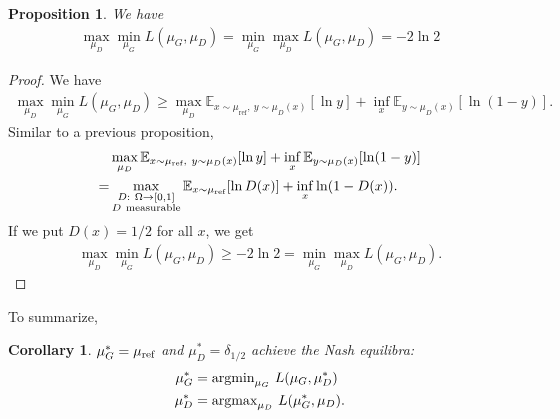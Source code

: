 \documentclass[12pt,oneside]{article}
\newcommand{\ra}[0]{\rightarrow}
\newcommand{\BE}[0]{\mathbb{E}}
\newcommand{\tn}[1]{\text{\normalfont #1}}
\newcommand{\ali}[1]{\begin{align*}#1\end{align*}}
\theoremstyle{plain}
\newtheorem*{prop}{Proposition}
\newtheorem*{cor}{Corollary}
\theoremstyle{remark}
\begin{document}
\begin{prop}
We have
\ali{
\max_{\mu_D} \min_{\mu_G} L(\mu_G, \mu_D) = \min_{\mu_G} \max_{\mu_D} L(\mu_G, \mu_D) = -2 \ln 2
}
\end{prop}
\begin{proof}
We have 
\ali{
    \max_{\mu_D} \min_{\mu_G} L(\mu_G, \mu_D) \geq \max_{\mu_D} \BE_{x \sim \mu_{\text{ref}}, \ y \sim \mu_D(x)} [\ln y] + \inf_x \BE_{y \sim \mu_D(x)} [\ln(1-y)].
}
Similar to a previous proposition, 
\ali{
    &\max_{\mu_D} \BE_{x \sim \mu_{\text{ref}}, \ y \sim \mu_D(x)} [\ln y] + \inf_x \BE_{y \sim \mu_D(x)} [\ln(1-y)] \\
= &\max_{\substack{D: \ \Omega \ra [0,1] \\ D \ \tn{measurable}}} \BE_{x \sim \mu_\tn{ref}} [\ln D(x)] + \inf_x \ln(1-D(x)).
}
If we put $D(x) = 1/2$ for all $x$, we get 
\ali{
\max_{\mu_D} \min_{\mu_G} L(\mu_G, \mu_D) \geq -2 \ln 2 = \min_{\mu_G} \max_{\mu_D} L(\mu_G, \mu_D).
}
\end{proof}

To summarize,
\begin{cor}
$\mu_G^* = \mu_\tn{ref}$ and $\mu_D^* = \delta_{1/2}$ achieve the Nash equilibra:
\ali{
    \mu_G^* &= \tn{argmin}_{\mu_G} \ L(\mu_G, \mu_D^*) \\
    \mu_D^* &= \tn{argmax}_{\mu_D} \ L(\mu_G^*, \mu_D).
}
\end{cor}
\end{document}
